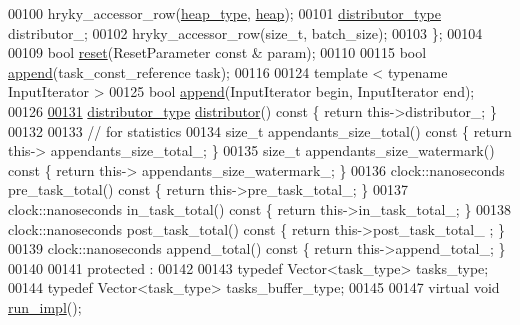 \begin{DoxyCode}
00100         hryky\_accessor\_row(\hyperlink{classhryky_1_1memory_1_1heap_1_1_base}{heap_type},   \hyperlink{namespacehryky_1_1memory_1_1global_a6fc6103f67c837aa0f39b359588409cd}{heap});
00101         \hyperlink{classhryky_1_1task_1_1distributor_1_1_batch}{distributor_type}                distributor\_;
00102         hryky\_accessor\_row(\textcolor{keywordtype}{size\_t},      batch\_size);
00103     \};
00104 
00109     \textcolor{keywordtype}{bool} \hyperlink{group__task_ga88b1f6b27be23acb9fd42203d7cd3933}{reset}(ResetParameter \textcolor{keyword}{const} & param);
00110 
00115     \textcolor{keywordtype}{bool} \hyperlink{group__task_gaef74f2d2dd44b8e13f615963ea1e1f0f}{append}(task\_const\_reference task);
00116 
00124     \textcolor{keyword}{template} < \textcolor{keyword}{typename} InputIterator >
00125     \textcolor{keywordtype}{bool} \hyperlink{group__task_gaef74f2d2dd44b8e13f615963ea1e1f0f}{append}(InputIterator begin, InputIterator end);
00126 
\hypertarget{task__worker__batch_8h_source_l00131}{}\hyperlink{classhryky_1_1task_1_1worker_1_1_batch_ae524443d01bdfe8db31bd6f01a983388}{00131}     \hyperlink{classhryky_1_1task_1_1distributor_1_1_batch}{distributor_type} \hyperlink{classhryky_1_1task_1_1worker_1_1_batch_ae524443d01bdfe8db31bd6f01a983388}{distributor}()\textcolor{keyword}{ const }\{ \textcolor{keywordflow}{return} this->distributor\_; \}
00132 
00133     \textcolor{comment}{// for statistics}
00134     \textcolor{keywordtype}{size\_t}              appendants\_size\_total()\textcolor{keyword}{ const }\{ \textcolor{keywordflow}{return} this->
      appendants\_size\_total\_; \}
00135     \textcolor{keywordtype}{size\_t}              appendants\_size\_watermark()\textcolor{keyword}{ const }\{ \textcolor{keywordflow}{return} this->
      appendants\_size\_watermark\_; \}
00136     clock::nanoseconds  pre\_task\_total()\textcolor{keyword}{ const }\{ \textcolor{keywordflow}{return} this->pre\_task\_total\_; 
      \}
00137     clock::nanoseconds  in\_task\_total()\textcolor{keyword}{ const }\{ \textcolor{keywordflow}{return} this->in\_task\_total\_; \}
00138     clock::nanoseconds  post\_task\_total()\textcolor{keyword}{ const }\{ \textcolor{keywordflow}{return} this->post\_task\_total\_
      ; \}
00139     clock::nanoseconds  append\_total()\textcolor{keyword}{ const }\{ \textcolor{keywordflow}{return} this->append\_total\_; \}
00140 
00141 \textcolor{keyword}{protected} :
00142 
00143     \textcolor{keyword}{typedef} Vector<task\_type>   tasks\_type;
00144     \textcolor{keyword}{typedef} Vector<task\_type>   tasks\_buffer\_type;
00145 
00147     \textcolor{keyword}{virtual} \textcolor{keywordtype}{void} \hyperlink{group__task_ga1f7366c2252fb0c7a7c8dc6f92a31e88}{run_impl}();

\end{DoxyCode}
